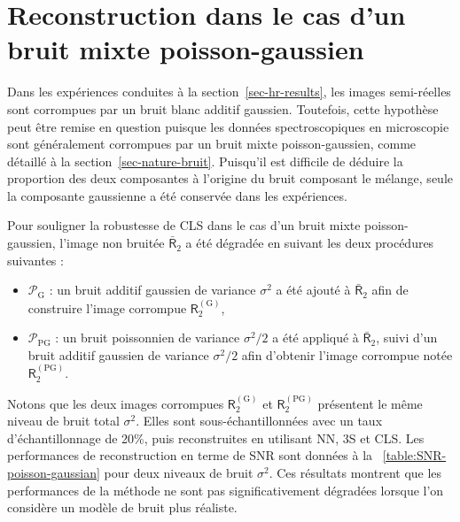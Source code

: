 \section{Reconstruction dans le cas d'un bruit mixte poisson-gaussien}\label{sec-bruit-mixte}

Dans les expériences conduites à la section~\ref{sec-hr-results}, les images semi-réelles sont corrompues par un bruit blanc additif gaussien. Toutefois, cette hypothèse peut être remise en question puisque les données spectroscopiques en microscopie sont généralement corrompues par un bruit mixte poisson-gaussien, comme détaillé à la section~\ref{sec-nature-bruit}. Puisqu'il est difficile de déduire la proportion des deux composantes à l'origine du bruit composant le mélange, seule la composante gaussienne a été conservée dans les expériences.

Pour souligner la robustesse de CLS dans le cas d'un bruit mixte poisson-gaussien, l'image non bruitée $\bar{\mathsf{R}}_2$ a été dégradée en suivant les deux procédures suivantes :
\begin{itemize}
    \item $\mathcal{P}_{\mathrm{G}}$ : un bruit additif gaussien de variance $\sigma^2$ a été ajouté à $\bar{\mathsf{R}}_2$ afin de construire l'image corrompue $\mathsf{R}_2^{(\mathrm{G})}$,
    \item $\mathcal{P}_{\mathrm{PG}}$ : un bruit poissonnien de variance $\sigma^2/2$ a été appliqué à $\bar{\mathsf{R}}_2$, suivi d'un bruit additif gaussien de variance $\sigma^2/2$ afin d'obtenir l'image corrompue notée $\mathsf{R}_2^{(\mathrm{PG})}$.
\end{itemize}
Notons que les deux images corrompues $\mathsf{R}_2^{(\mathrm{G})}$ et $\mathsf{R}_2^{(\mathrm{PG})}$ présentent le même niveau de bruit total $\sigma^2$. Elles sont sous-échantillonnées avec un taux d'échantillonnage de 20\%, puis reconstruites en utilisant NN, 3S et CLS. Les performances de reconstruction en terme de SNR sont données à la \tabname~\ref{table:SNR-poisson-gaussian} pour deux niveaux de bruit $\sigma^2$. Ces résultats montrent que les performances de la méthode ne sont pas significativement dégradées lorsque l'on considère un modèle de bruit plus réaliste.

